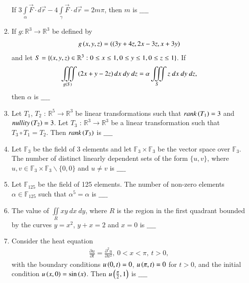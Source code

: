 \documentclass[journal]{IEEEtran}
\begin{document}
\begin{enumerate}
\begin{align*}
\end{align*}
If $3\int\limits_{\alpha} \overrightarrow{F} \cdot d \overrightarrow{r} - 4\int\limits_{\gamma} \overrightarrow{F} \cdot d \overrightarrow{r} = 2m\pi$, then $m$ is $\_\_\_\_$ \\
\item If $g: \mathbb{R}^3 \rightarrow \mathbb{R}^3$ be defined by 
\begin{align*}
    g\left(x, y, z\right) = \left((3y + 4z, 2x - 3z, x + 3y\right)
\end{align*} 
and let $S = \{\left(x, y, z\right) \in \mathbb{R}^3 : 0 \leq x \leq 1, 0 \leq y \leq 1, 0 \leq z \leq 1\}$. If
\begin{align*}
    \iiint\limits_{g\left(S\right)}\left(2x + y - 2z\right)dx\ dy\ dz = \alpha\iiint\limits_{S}z\ dx\ dy\ dz,
\end{align*}
then $\alpha$ is $\_\_\_\_$ \\
\item Let $T_1$, $T_2$ : $\mathbb{R}^5 \rightarrow \mathbb{R}^3$ be linear transformations such that $rank\left(T_1\right) = 3$ and $nullity\left(T_2\right) = 3$. Let
$T_3$ : $\mathbb{R}^3 \rightarrow \mathbb{R}^3$ be a linear transformation such that $T_3 \circ T_1 = T_2$. Then $rank\left(T_3\right)$ is $\_\_\_\_$ \\
\item Let $\mathbb{F}_3$ be the field of 3 elements and let $\mathbb{F}_3 \times \mathbb{F}_3$ be the vector space over $\mathbb{F}_3$. The number of
distinct linearly dependent sets of the form $\{u, v\}$, where $u, v \in \mathbb{F}_3 \times \mathbb{F}_3 \backslash \{0, 0\}$ and $u \neq v$ is $\_\_\_\_$ \\
\item Let $\mathbb{F}_{125}$ be the field of 125 elements. The number of non-zero elements $\alpha \in \mathbb{F}_{125}$ such that $\alpha^5 = \alpha$ is $\_\_\_\_$ \\
\item The value of $\iint\limits_{R}xy\ dx\ dy$, where $R$ is the region in the first quadrant bounded by the curves $y = x^2$, $y + x = 2$ and $x = 0$ is $\_\_\_\_$ \\
\item Consider the heat equation
\begin{align*}
    \frac{\partial u}{\partial t} = \frac{\partial^2 u}{\partial x^2},\ 0 < x < \pi,\ t > 0,
\end{align*}
with the boundary conditions $u\left(0, t\right) = 0$, $u\left(\pi, t\right) = 0$ for $t > 0$, and the initial condition $u\left(x, 0\right)= \sin\left(x\right)$. Then $u\left(\frac{\pi}{2}, 1\right)$ is $\_\_\_\_$ \\

\end{enumerate}
\end{document}
